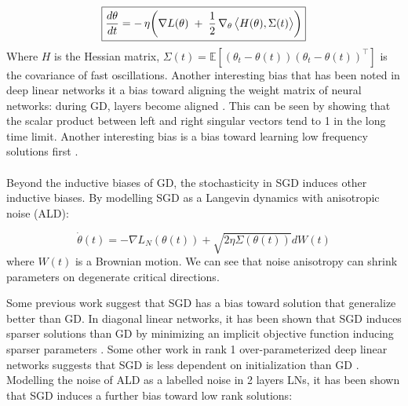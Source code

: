 \documentclass[11pt]{article}
\begin{document}

\[
\boxed{%
  \frac{d \theta}{d t}
  = -\,\eta\!\left(
      \nabla L(\theta)
      \;+\;\frac{1}{2}\,
      \nabla_{\theta}\,\bigl\langle H(\theta),\Sigma(t)\bigr\rangle
    \right)}    
\]
Where $H$ is the Hessian matrix, $\Sigma(t) = \mathbb{E}[(\theta_{t}-\theta(t))(\theta_{t}-\theta(t))^{\!\top}]$ is the covariance of fast oscillations.
Another interesting bias that has been noted in deep linear networks it a bias toward aligning the weight matrix of neural networks: during GD, layers become aligned \citep{ji2018gradient}. This can be seen by showing that the scalar product between left and right singular vectors tend to 1 in the long time limit. Another interesting bias is a bias toward learning low frequency solutions first \citep{xu2024overview}.
\\
\\
Beyond the inductive biases of GD, the stochasticity in SGD induces other inductive biases. By modelling SGD as a Langevin dynamics with anisotropic noise (ALD):

\begin{equation}
    \dot{\theta}(t) = -\nabla L_N(\theta(t)) + \sqrt{2\eta\Sigma(\theta(t))} dW(t)
\end{equation}
where $W(t)$ is a Brownian motion. We can see that noise anisotropy can shrink parameters on degenerate critical directions.

Some previous work suggest that SGD has a bias toward solution that generalize better than GD. In diagonal linear networks, it has been shown that SGD induces sparser solutions than GD by minimizing an implicit objective function inducing sparser parameters \citep{pesme2021implicit}. Some other work in rank 1 over-parameterized deep linear networks suggests that SGD is less dependent on initialization than GD \citep{lyu2023implicit}. Modelling the noise of ALD as a labelled noise in 2 layers LNs, it has been shown that SGD induces a further bias toward low rank solutions\citep{varre2024sgd}:

\end{document}
